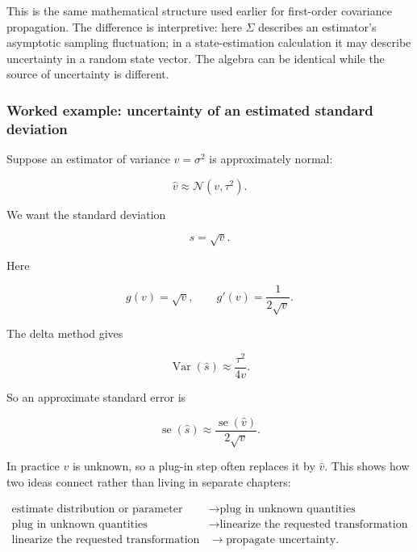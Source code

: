 This is the same mathematical structure used earlier for first-order covariance propagation. The difference is interpretive: here \(\Sigma\) describes an estimator's asymptotic sampling fluctuation; in a state-estimation calculation it may describe uncertainty in a random state vector. The algebra can be identical while the source of uncertainty is different.

\begin{allmightroleexample}

\subsubsection{Worked example: uncertainty of an estimated standard deviation}\label{02-foundations-ii-ch030-worked-example-uncertainty-of-an-estimated-standard-deviation}

\hypertarget{02-foundations-ii-ch030-worked-example-uncertainty-of-an-estimated-standard-deviation}{}

Suppose an estimator of variance \(v=\sigma^2\) is approximately normal:

\end{allmightroleexample}

\[
\widehat v
\approx
\mathcal N(v,\tau^2).
\]

We want the standard deviation

\[
s=\sqrt v.
\]

Here

\[
g(v)=\sqrt v,
\qquad
g'(v)=\frac{1}{2\sqrt v}.
\]

The delta method gives

\[
\operatorname{Var}(\widehat s)
\approx
\frac{\tau^2}{4v}.
\]

So an approximate standard error is

\[
\boxed{
\operatorname{se}(\widehat s)
\approx
\frac{\operatorname{se}(\widehat v)}
{2\sqrt v}
}.
\]

In practice \(v\) is unknown, so a plug-in step often replaces it by \(\widehat v\). This shows how two ideas connect rather than living in separate chapters:

\[\begin{aligned}\text{estimate distribution or parameter} &\rightarrow \text{plug in unknown quantities}\\\text{plug in unknown quantities} &\rightarrow \text{linearize the requested transformation}\\\text{linearize the requested transformation} &\rightarrow \text{propagate uncertainty}.\end{aligned}\]

